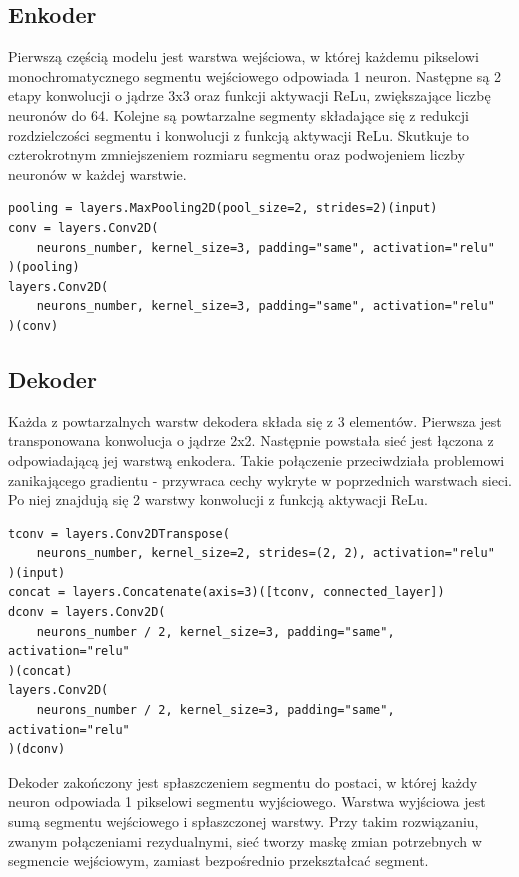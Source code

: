 \documentclass[a4paper, 12pt]{article}
\begin{document}
\subsection{Enkoder}
Pierwszą częścią modelu jest warstwa wejściowa, w której każdemu pikselowi monochromatycznego segmentu wejściowego odpowiada 1 neuron.
Następne są 2 etapy konwolucji o jądrze 3x3 oraz funkcji aktywacji ReLu, zwiększające liczbę neuronów do 64.
Kolejne są powtarzalne segmenty składające się z redukcji rozdzielczości segmentu i konwolucji z funkcją aktywacji ReLu.
Skutkuje to czterokrotnym zmniejszeniem rozmiaru segmentu oraz podwojeniem liczby neuronów w każdej warstwie.
\lstset{language=Python}
\lstset{frame=lines}
\lstset{basicstyle=\footnotesize}
\begin{lstlisting}
pooling = layers.MaxPooling2D(pool_size=2, strides=2)(input)
conv = layers.Conv2D(
    neurons_number, kernel_size=3, padding="same", activation="relu"
)(pooling)
layers.Conv2D(
    neurons_number, kernel_size=3, padding="same", activation="relu"
)(conv)
\end{lstlisting}
\newpage

\subsection{Dekoder}
Każda z powtarzalnych warstw dekodera składa się z 3 elementów.
Pierwsza jest transponowana konwolucja o jądrze 2x2. Następnie powstała sieć jest łączona z odpowiadającą jej warstwą enkodera.
Takie połączenie przeciwdziała problemowi zanikającego gradientu - przywraca cechy wykryte w poprzednich warstwach sieci.
Po niej znajdują się 2 warstwy konwolucji z funkcją aktywacji ReLu.
\lstset{language=Python}
\lstset{frame=lines}
\lstset{basicstyle=\footnotesize}
\begin{lstlisting}
tconv = layers.Conv2DTranspose(
    neurons_number, kernel_size=2, strides=(2, 2), activation="relu"
)(input)
concat = layers.Concatenate(axis=3)([tconv, connected_layer])
dconv = layers.Conv2D(
    neurons_number / 2, kernel_size=3, padding="same", activation="relu"
)(concat)
layers.Conv2D(
    neurons_number / 2, kernel_size=3, padding="same", activation="relu"
)(dconv)
\end{lstlisting}

Dekoder zakończony jest spłaszczeniem segmentu do postaci, w której każdy neuron odpowiada 1 pikselowi segmentu wyjściowego.
Warstwa wyjściowa jest sumą segmentu wejściowego i spłaszczonej warstwy.
Przy takim rozwiązaniu, zwanym połączeniami rezydualnymi, sieć tworzy maskę zmian potrzebnych w segmencie wejściowym,
zamiast bezpośrednio przekształcać segment. \cite{he2015deep}
\end{document}
